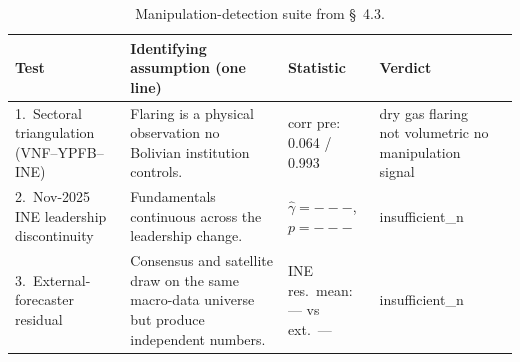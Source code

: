 \begin{table}[H]
\centering\small
\caption{Manipulation-detection suite from \S~4.3.}
\label{tab:manipulation}
\begin{tabular}{p{3.2cm}p{5.8cm}p{2cm}p{2cm}p{2cm}}
\toprule
Test & Identifying assumption (one line) & Statistic & Verdict \\
\midrule
1.\ Sectoral triangulation (VNF--YPFB--INE) & Flaring is a physical observation no Bolivian institution controls. & corr pre: 0.064 / 0.993 & dry gas flaring not volumetric no manipulation signal \\
\midrule
2.\ Nov-2025 INE leadership discontinuity & Fundamentals continuous across the leadership change. & $\hat\gamma = ---$, $p = ---$ & insufficient_n \\
\midrule
3.\ External-forecaster residual & Consensus and satellite draw on the same macro-data universe but produce independent numbers. & INE res.\ mean: --- vs ext.\ --- & insufficient_n \\
\bottomrule
\end{tabular}
\end{table}